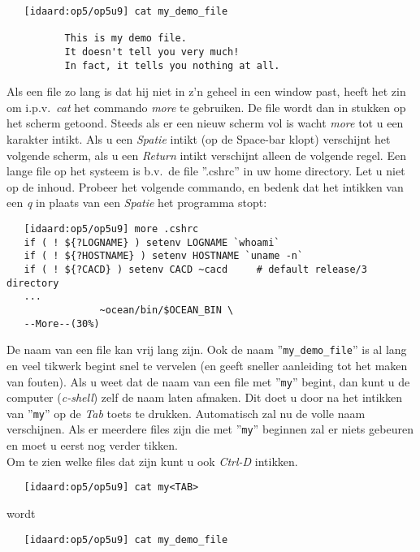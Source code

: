 \begin{verbatim}
   [idaard:op5/op5u9] cat my_demo_file

          This is my demo file.
          It doesn't tell you very much!
          In fact, it tells you nothing at all.
\end{verbatim}
Als een file zo lang is dat hij niet in z'n geheel in een window past,
heeft het zin om i.p.v.\ {\em cat} het commando {\em more} te gebruiken.
De file wordt dan in stukken op het scherm getoond.
Steeds als er een nieuw scherm vol is wacht {\em more}
tot u een karakter intikt.
Als u een {\em Spatie} intikt (op de Space-bar klopt)
verschijnt het volgende scherm,
als u een {\em Return} intikt verschijnt alleen de volgende regel.
Een lange file op het systeem is
b.v.\ de file ''.cshrc'' in uw home directory.
Let u niet op de inhoud.
Probeer het volgende commando, en
bedenk dat het intikken van een {\em q} in plaats van een {\em Spatie}
het programma stopt:
\begin{verbatim}
   [idaard:op5/op5u9] more .cshrc
   if ( ! ${?LOGNAME} ) setenv LOGNAME `whoami`
   if ( ! ${?HOSTNAME} ) setenv HOSTNAME `uname -n`
   if ( ! ${?CACD} ) setenv CACD ~cacd     # default release/3 directory
   ...
                ~ocean/bin/$OCEAN_BIN \
   --More--(30%)
\end{verbatim}
De naam van een file kan vrij lang zijn.
Ook de naam ''{\tt my\_demo\_file}'' is al lang
en veel tikwerk begint snel te vervelen
(en geeft sneller aanleiding tot het maken van fouten).
Als u weet dat de naam van een file met ''{\tt my}'' begint,
dan kunt u de computer ({\em c-shell}) zelf de naam laten afmaken.
Dit doet u door na het intikken van ''{\tt my}''
op de {\em Tab} toets te drukken.
Automatisch zal nu de volle naam verschijnen.
Als er meerdere files zijn die met ''{\tt my}'' beginnen zal
er niets gebeuren en moet u eerst nog verder tikken.\\
Om te zien welke files dat zijn
kunt u ook {\em Ctrl-D} intikken.
\begin{verbatim}
   [idaard:op5/op5u9] cat my<TAB>
\end{verbatim}

wordt

\begin{verbatim}
   [idaard:op5/op5u9] cat my_demo_file
\end{verbatim}

